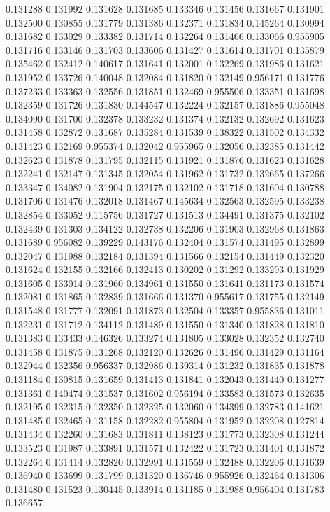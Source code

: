 0.131288
0.131992
0.131628
0.131685
0.133346
0.131456
0.131667
0.131901
0.132500
0.130855
0.131779
0.131386
0.132371
0.131834
0.145264
0.130994
0.131682
0.133029
0.133382
0.131714
0.132264
0.131466
0.133066
0.955905
0.131716
0.133146
0.131703
0.133606
0.131427
0.131614
0.131701
0.135879
0.135462
0.132412
0.140617
0.131641
0.132001
0.132269
0.131986
0.131621
0.131952
0.133726
0.140048
0.132084
0.131820
0.132149
0.956171
0.131776
0.137233
0.133363
0.132556
0.131851
0.132469
0.955506
0.133351
0.131698
0.132359
0.131726
0.131830
0.144547
0.132224
0.132157
0.131886
0.955048
0.134090
0.131700
0.132378
0.133232
0.131374
0.132132
0.132692
0.131623
0.131458
0.132872
0.131687
0.135284
0.131539
0.138322
0.131502
0.134332
0.131423
0.132169
0.955374
0.132042
0.955965
0.132056
0.132385
0.131442
0.132623
0.131878
0.131795
0.132115
0.131921
0.131876
0.131623
0.131628
0.132241
0.132147
0.131345
0.132054
0.131962
0.131732
0.132665
0.137266
0.133347
0.134082
0.131904
0.132175
0.132102
0.131718
0.131604
0.130788
0.131706
0.131476
0.132018
0.131467
0.145634
0.132563
0.132595
0.133238
0.132854
0.133052
0.115756
0.131727
0.131513
0.134491
0.131375
0.132102
0.132439
0.131303
0.134122
0.132738
0.132206
0.131903
0.132968
0.131863
0.131689
0.956082
0.139229
0.143176
0.132404
0.131574
0.131495
0.132899
0.132047
0.131988
0.132184
0.131394
0.131566
0.132154
0.131449
0.132320
0.131624
0.132155
0.132166
0.132413
0.130202
0.131292
0.133293
0.131929
0.131605
0.133014
0.131960
0.134961
0.131550
0.131641
0.131173
0.131574
0.132081
0.131865
0.132839
0.131666
0.131370
0.955617
0.131755
0.132149
0.131548
0.131777
0.132091
0.131873
0.132504
0.133357
0.955836
0.131011
0.132231
0.131712
0.134112
0.131489
0.131550
0.131340
0.131828
0.131810
0.131383
0.133433
0.146326
0.133274
0.131805
0.133028
0.132352
0.132740
0.131458
0.131875
0.131268
0.132120
0.132626
0.131496
0.131429
0.131164
0.132944
0.132356
0.956337
0.132986
0.139314
0.131232
0.131835
0.131878
0.131184
0.130815
0.131659
0.131413
0.131841
0.132043
0.131440
0.131277
0.131361
0.140474
0.131537
0.131602
0.956194
0.133583
0.131573
0.132635
0.132195
0.132315
0.132350
0.132325
0.132060
0.134399
0.132783
0.141621
0.131485
0.132465
0.131158
0.132282
0.955804
0.131952
0.132208
0.127814
0.131434
0.132260
0.131683
0.131811
0.138123
0.131773
0.132308
0.131244
0.133523
0.131987
0.133891
0.131571
0.132422
0.131723
0.131401
0.131872
0.132264
0.131414
0.132820
0.132991
0.131559
0.132488
0.132206
0.131639
0.136940
0.133699
0.131799
0.131320
0.136746
0.955926
0.132464
0.131306
0.131480
0.131523
0.130445
0.133914
0.131185
0.131988
0.956404
0.131783
0.136657
